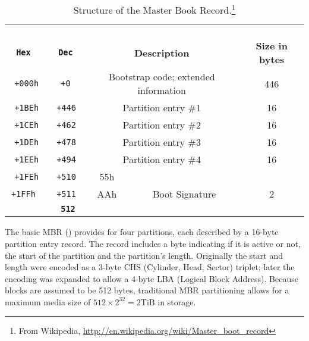 \begin{table}
\begin{minipage}{\textwidth}
\caption{Structure of the Master Book Record.\protect\footnote{From Wikipedia, \url{http://en.wikipedia.org/wiki/Master_boot_record}}}\label{mbr}
\begin{tabular}{|>{\tt}c|>{\tt}c|c|c|c|}
\hline
\multicolumn{2}{|c|}{\bf Address} & \multicolumn{2}{c|}{}                              & \\
\cline{1-2} \bf Hex & \bf Dec         & \multicolumn{2}{c|}{\multirow{-2}{*}{\bf Description}} & \multirow{-2}{*}{\bf Size in bytes}\\
\hline
+000h & +0   & \multicolumn{2}{c|}{Bootstrap code; extended information} & 446 \\
\hline
\hline
+1BEh & +446 & \multicolumn{2}{c|}{Partition entry \#1} & 16 \\
\hline
+1CEh & +462 & \multicolumn{2}{c|}{Partition entry \#2} & 16 \\
\hline
+1DEh & +478 & \multicolumn{2}{c|}{Partition entry \#3} & 16 \\
\hline
+1EEh & +494 & \multicolumn{2}{c|}{Partition entry \#4} & 16 \\
\hline
+1FEh & +510 & 55h & & \\
\cline{1-3}
+1FFh & +511 & AAh & \multirow{-2}{*}{Boot Signature} & \multirow{-2}{*}{2} \\
\hline
\hline
\multicolumn{4}{|r|}{\textbf{Total size: $\bf 446 + (4\times16) + 2 $}} & \textbf{512}\\
\hline
\end{tabular}
\end{minipage}
\end{table}

The basic MBR () provides for four partitions, each
described by a 16-byte partition entry record. The record includes a byte
indicating if it is active or not, the start of the partition and the
partition's length.  Originally the start and length were encoded as a 
3-byte CHS (Cylinder, Head, Sector) triplet; later the encoding was
expanded to allow a 4-byte LBA (Logical Block
Address). Because blocks
are assumed to be 512 bytes, traditional MBR partitioning allows for a
maximum media size of $512 \times 2^{32}=2\textrm{TiB}$ in storage.

